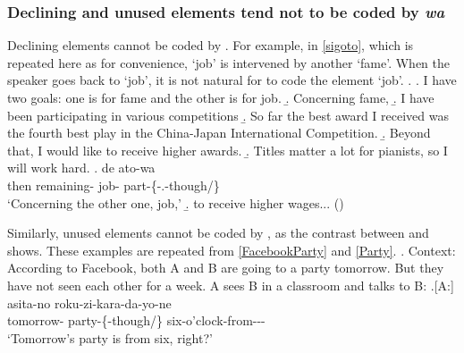 \subsubsection{Declining and unused elements tend not to be coded by \textit{wa}}\label{Par:Wa:DecUnusedWa}

Declining elements cannot be coded by .
For example, in \ref{sigoto}, which is repeated here as \Next for convenience,
`job' is intervened by another  `fame'.
When the speaker goes back to `job',
it is not natural for  to code the element `job'.
%
\ex.
 \a. I have two goals: one is for fame and the other is for job.
 \b. Concerning fame,
 \b. I have been participating in various  competitions
 \b. So far the best award I received was the fourth best play in the China-Japan International Competition.
 \b. Beyond that, I would like to receive higher awards.
 \b. Titles matter a lot for pianists, so I will work hard.
 \bg. de ato-wa   \\
 	then remaining- job- part-\{-.-though/\} \\
	`Concerning the other one, job,'
 \b. to receive higher wages...
\hfill{()}
%

Similarly,
unused elements cannot be coded by ,
as the contrast between \Next and \NNext shows.
These examples are repeated from \ref{FacebookParty} and \ref{Party}.
%
\ex. Context: According to Facebook, both A and B are going to a party tomorrow. But they have not seen each other for a week. A sees B in a classroom and talks to B:
	\a.[A:] asita-no  roku-zi-kara-da-yo-ne \\
		tomorrow- party-\{-though/\} six-o'clock-from--\ab{fp}- \\
		`Tomorrow's party is from six, right?' 

